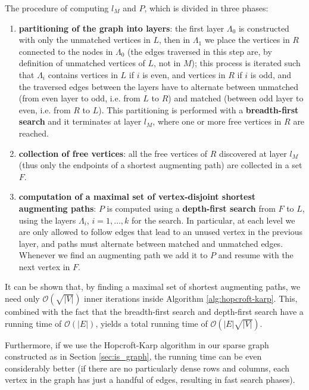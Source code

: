 The procedure of computing $l_M$ and $P$, which is divided in three phases:

\begin{enumerate}
	\item \textbf{partitioning of the graph into layers}: the first layer $\Lambda_0$ is constructed with only the unmatched vertices in $L$, then in $\Lambda_1$ we place the vertices in $R$ connected to the nodes in $\Lambda_0$ (the edges traversed in this step are, by definition of unmatched vertices of $L$, not in $M$); this process is iterated such that $\Lambda_i$ contains vertices in $L$ if $i$ is even, and vertices in $R$ if $i$ is odd, and the traversed edges between the layers have to alternate between unmatched (from even layer to odd, i.e. from $L$ to $R$) and matched (between odd layer to even, i.e. from $R$ to $L$). This partitioning is performed with a \textbf{breadth-first search} and it terminates at layer $l_M$, where one or more free vertices in $R$ are reached.
	\item \textbf{collection of free vertices}: all the free vertices of $R$ discovered at layer $l_M$ (thus only the endpoints of a shortest augmenting path) are collected in a set $F$.
	\item \textbf{computation of a maximal set of vertex-disjoint shortest augmenting paths}: $P$ is computed using a \textbf{depth-first search} from $F$ to $L$, using the layers $\Lambda_i$, $i=1,\dots,k$ for the search. In particular, at each level we are only allowed to follow edges that lead to an unused vertex in the previous layer, and paths must alternate between matched and unmatched edges. Whenever we find an augmenting path we add it to $P$ and resume with the next vertex in $F$.
\end{enumerate}

It can be shown that, by finding a maximal set of shortest augmenting paths, we need only $\mathcal{O}\left( \sqrt{|V|} \right)$ inner iterations inside Algorithm \ref{alg:hopcroft-karp}. This, combined with the fact that the breadth-first search and depth-first search have a running time of $\mathcal{O}(|E|)$, yields a total running time of $\mathcal{O} \left( |E|\sqrt{|V|} \right)$.

Furthermore, if we use the Hopcroft-Karp algorithm in our sparse graph constructed as in Section \ref{sec:is_graph}, the running time can be even considerably better (if there are no particularly dense rows and columns, each vertex in the graph has just a handful of edges, resulting in fast search phases).

